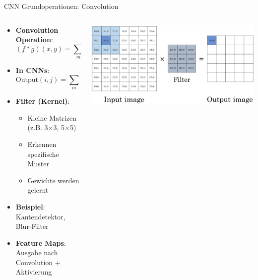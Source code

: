 \documentclass[aspectratio=1610, xcolor=dvipsnames, 9pt]{beamer}
\begin{document}
      \begin{frame}{CNN Grundoperationen: Convolution}
        \begin{columns}
          \begin{column}{0.7\textwidth}
            \begin{itemize}
              \item \textbf{Convolution Operation}:
              \begin{equation}
                (f * g)(x,y) = \sum_{m} \sum_{n} f(m,n) \cdot g(x-m, y-n)
              \end{equation}
              \item \textbf{In CNNs}:
              \begin{equation}
                \text{Output}(i,j) = \sum_{m} \sum_{n} \text{Filter}(m,n) \cdot \text{Input}(i+m, j+n)
              \end{equation}
              \item \textbf{Filter (Kernel)}:
              \begin{itemize}
                \item Kleine Matrizen (z.B. 3×3, 5×5)
                \item Erkennen spezifische Muster
                \item Gewichte werden gelernt
              \end{itemize}
              \item \textbf{Beispiel}: Kantendetektor, Blur-Filter
              \item \textbf{Feature Maps}: Ausgabe nach Convolution + Aktivierung
            \end{itemize}
          \end{column}
          \begin{column}{0.3\textwidth}
            \centering
            \includegraphics[width=\textwidth]{images/convolution.png}
          \end{column}
        \end{columns}
      \end{frame}
      
\end{document}
